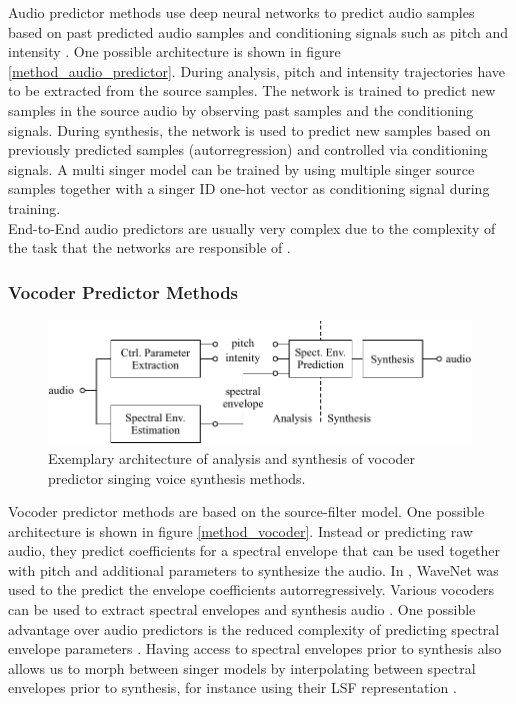 \documentclass{article}
\begin{document}
Audio predictor methods use deep neural networks to predict audio samples based on past predicted audio samples and conditioning signals such as pitch and intensity \cite{oord_wavenet:_2016}. One possible architecture is shown in figure \ref{method_audio_predictor}. During analysis, pitch and intensity trajectories have to be extracted from the source samples. The network is trained to predict new samples in the source audio by observing past samples and the conditioning signals. During synthesis, the network is used to predict new samples based on previously predicted samples (autorregression) and controlled via conditioning signals. A multi singer model can be trained by using multiple singer source samples together with a singer ID one-hot vector as conditioning signal during training. \\
End-to-End audio predictors are usually very complex due to the complexity of the task that the networks are responsible of \cite{engel_ddsp:_2020}.

\subsubsection*{Vocoder Predictor Methods}

\begin{figure}[H]
    \centering
    \includegraphics{Graphics/008_method_vocoder_predictor.pdf}
    \caption{Exemplary architecture of analysis and synthesis of vocoder predictor singing voice synthesis methods. }
    \label{fig:method_vocoder}
\end{figure}

Vocoder predictor methods are based on the source-filter model. One possible architecture is shown in figure \ref{method_vocoder}. Instead or predicting raw audio, they predict coefficients for a spectral envelope that can be used together with pitch and additional parameters to synthesize the audio. In  \cite{blaauw_neural_2017-1}, WaveNet was used to the predict the envelope coefficients autorregressively. Various vocoders can be used to extract spectral envelopes and synthesis audio \cite{morise_world:_2016}. One possible advantage over audio predictors is the reduced complexity of predicting spectral envelope parameters \cite{engel_ddsp:_2020}. Having access to spectral envelopes prior to synthesis also allows us to morph between singer models by interpolating between spectral envelopes prior to synthesis, for instance using their LSF representation \cite{roddy_method_2014}. 
\end{document}
